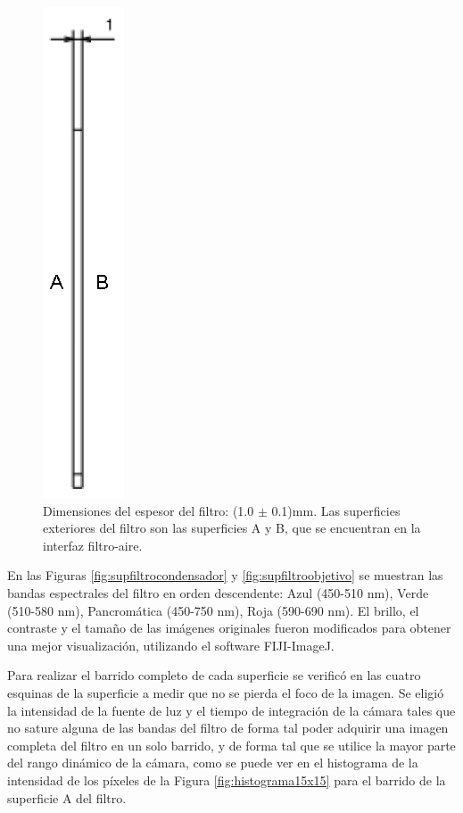 \begin{figure}[H]
	\centering
	\includegraphics[scale=0.7]{Figs/cuantificaciondefectos/espesorfiltro.png}
	\caption{Dimensiones del espesor del filtro: (1.0 $\pm$ 0.1)mm. Las superficies exteriores del filtro son las superficies A y B, que se encuentran en la interfaz filtro-aire.}
	\label{fig:espfil}
\end{figure}
En las Figuras \ref{fig:supfiltrocondensador} y \ref{fig:supfiltroobjetivo} se muestran las bandas espectrales del filtro en orden descendente: Azul (450-510 nm), Verde (510-580 nm), Pancromática (450-750 nm), Roja (590-690 nm). El brillo, el contraste y el tamaño de las imágenes originales fueron modificados para obtener una mejor visualización, utilizando el software FIJI-ImageJ. 

Para realizar el barrido completo de cada superficie se verificó en las cuatro esquinas de la superficie a medir que no se pierda el foco de la imagen. Se eligió la intensidad de la fuente de luz y el tiempo de integración de la cámara tales que no sature alguna de las bandas del filtro de forma tal poder adquirir una imagen completa del filtro en un solo barrido, y de forma tal que se utilice la mayor parte del rango dinámico de la cámara, como se puede ver en el histograma de la intensidad de los píxeles de la Figura \ref{fig:histograma15x15} para el barrido de la superficie A del filtro. 

